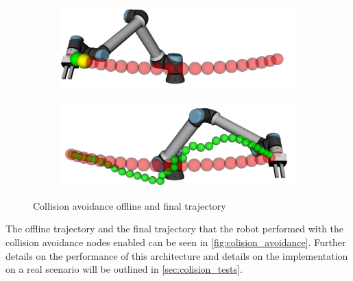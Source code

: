 \begin{figure}[h]
    \centering
    \begin{subfigure}{.50\linewidth}
      \centering
      \includegraphics[width=\linewidth]{figs/chp4/col_avoid_start.png}
    \end{subfigure}%
    \begin{subfigure}{.50\linewidth}
        \centering
        \includegraphics[width=\linewidth]{figs/chp4/col_avoid_end.png}
    \end{subfigure}
    \caption{Collision avoidance offline and final trajectory}
    \label{fig:colision_avoidance}
\end{figure}

\par The offline trajectory and the final trajectory that the robot performed with the collision avoidance nodes enabled can be seen in \autoref{fig:colision_avoidance}. Further details on the performance of this architecture and details on the implementation on a real scenario will be outlined in \autoref{sec:colision_tests}.

